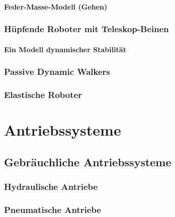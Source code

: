 \documentclass[a4paper, 11pt, accentcolor = tud3b]{tudreport}
\begin{document}
				\subsubsection{Feder-Masse-Modell (Gehen)} %

			\subsection{Hüpfende Roboter mit Teleskop-Beinen} %

				\subsubsection{Ein Modell dynamischer Stabilität} %

			\subsection{Passive Dynamic Walkers} %

			\subsection{Elastische Roboter} %

	\chapter{Antriebssysteme} %

		\section{Gebräuchliche Antriebssysteme} %

			\subsection{Hydraulische Antriebe} %

			\subsection{Pneumatische Antriebe} %
\end{document}

